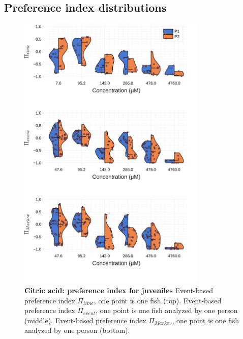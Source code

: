 \begin{appendices}
  \chapter{Preference index distributions}
    \begin{figure}[h]
      \centering
      \includegraphics[width=0.8\textwidth]{part_2/assets/dist_citricacid.png}
      \caption{\textbf{Citric acid: preference index for juveniles} Event-based preference index $\Pi_{time}$, one point is one fish (top). Event-based preference index $\Pi_{event}$, one point is one fish analyzed by one person (middle). Event-based preference index $\Pi_{Markov}$, one point is one fish analyzed by one person (bottom).}
      \label{dist_citric_acid}
    \end{figure}
    \begin{figure}[h]
      \centering

\end{figure}
\end{appendices}
